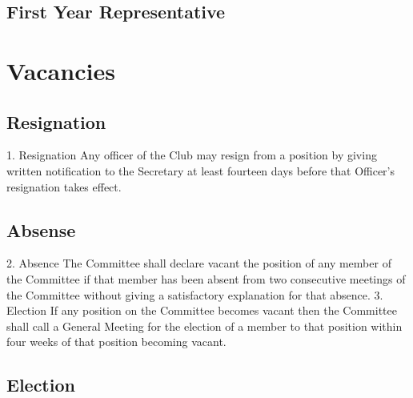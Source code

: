 \documentclass[12pt]{article} %
\begin{document}
\subsection{First Year Representative}

\section{Vacancies}
\subsection{Resignation}
1. Resignation
Any officer of the Club may resign from a position by giving written notification to
the Secretary at least fourteen days before that Officer's resignation takes effect.
\subsection{Absense}
2. Absence
The Committee shall declare vacant the position of any member of the Committee if
that member has been absent from two consecutive meetings of the Committee
without giving a satisfactory explanation for that absence.
3. Election
If any position on the Committee becomes vacant then the Committee shall call a
General Meeting for the election of a member to that position within four weeks of
that position becoming vacant.
\subsection{Election}
\end{document}
